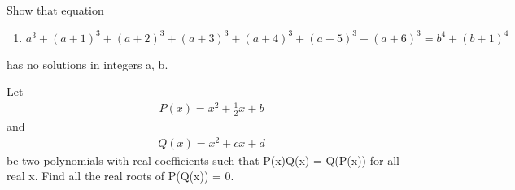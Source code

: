 \item Show that equation  
\begin{enumerate}
\item $a^3+(a+1)^3 + (a+2)^3 + (a+3)^3 + (a+4)^3 + (a+5)^3 + (a+6)^3 = b^4 + (b+1)^4$
\end{enumerate}
has no solutions in integers a, b.

\item Let
\begin{align*} 
P(x) = x^2 + \frac{1}{2}x + b
\end{align*} 
and
\begin{align*} 
Q(x) = x^2 + cx + d 
\end{align*}
be two polynomials with real coefficients such that P(x)Q(x) = Q(P(x)) for all real x. Find all the real roots of P(Q(x)) = 0.
